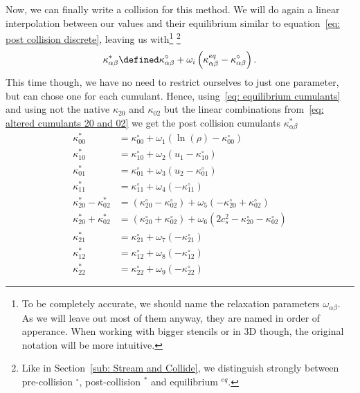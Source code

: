 
Now, we can finally write a collision for this method.
We will do again a linear interpolation between our values and their equilibrium similar to equation~\eqref{eq: post collision discrete}, leaving us with\footnote{To be completely accurate, we should name the relaxation parameters $\omega_{\alpha\beta}$.
As we will leave out most of them anyway, they are named in order of apperance.
When working with bigger stencils or in 3D though, the original notation will be more intuitive.}
\footnote{Like in Section~\eqref{sub: Stream and Collide}, we distinguish strongly between pre-collision $^\circ$, post-collision $^*$ and equilibrium $^{eq}$.}
\begin{equation}
  \kappa_{\alpha\beta}^* \defined \kappa_{\alpha\beta}^{\circ} + \omega_i \left( \kappa_{\alpha\beta}^{eq} - \kappa_{\alpha\beta}^{\circ} \right).
\end{equation}
This time though, we have no need to restrict ourselves to just one parameter, but can chose one for each cumulant.
Hence, using~\eqref{eq: equilibrium cumulants} and using not the native $\kappa_{20}$ and $\kappa_{02}$ but the linear combinations from~\eqref{eq: altered cumulants 20 and 02} we get the post collision cumulants $\kappa_{\alpha\beta}^*$
\begin{equation}
  \label{eq: post equilibrium cumulants}
  \begin{aligned}
    \kappa_{00}^{*} & = \kappa_{00}^{\circ}+ \omega_1 \left( \ln(\rho) - \kappa_{00}^{\circ}\right) \\
    \kappa_{10}^{*} & = \kappa_{10}^{\circ}+ \omega_2 \left( u_1 - \kappa_{10}^{\circ}\right) \\
    \kappa_{01}^{*} & = \kappa_{01}^{\circ}+ \omega_3 \left( u_2 - \kappa_{01}^{\circ}\right) \\
    \kappa_{11}^{*} & = \kappa_{11}^{\circ}+ \omega_4 \left( - \kappa_{11}^{\circ}\right) \\
    \kappa_{20}^{*} - \kappa_{02}^{*}
      & = (\kappa_{20}^{\circ}- \kappa_{02}^{\circ}) + \omega_5 \left( - \kappa_{20}^{\circ}+ \kappa_{02}^{\circ}\right) \\
    \kappa_{20}^{*} + \kappa_{02}^{*}
      & = (\kappa_{20}^{\circ}+ \kappa_{02}^{\circ}) + \omega_6 \left( 2 c_s^2 - \kappa_{20}^{\circ}- \kappa_{02}^{\circ}\right) \\
    \kappa_{21}^{*} & = \kappa_{21}^{\circ}+ \omega_7 \left( - \kappa_{21}^{\circ}\right) \\
    \kappa_{12}^{*} & = \kappa_{12}^{\circ}+ \omega_8 \left( - \kappa_{12}^{\circ}\right) \\
    \kappa_{22}^{*} & = \kappa_{22}^{\circ}+ \omega_9 \left( - \kappa_{22}^{\circ}\right)
  \end{aligned}
\end{equation}
